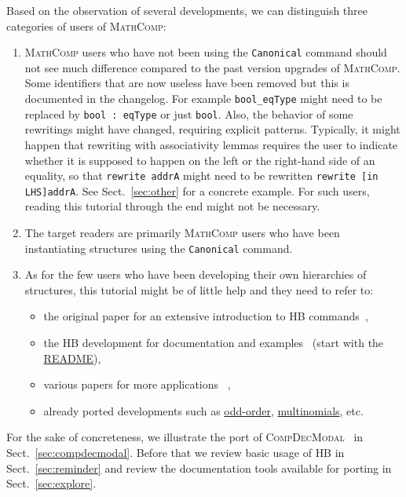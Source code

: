 \documentclass{article}
\def\mathcomp{\textsc{MathComp}}
\def\hb{\textsc{HB}}
\def\compdecmodal{\textsc{CompDecModal}}
\def\coqin#1{\texttt{#1}}
\begin{document}
Based on the observation of several developments, we can distinguish
three categories of users of \mathcomp:
\begin{enumerate}
\item \mathcomp{} users who have not been using the \coqin{Canonical}
  command should not see much difference compared to the past version
  upgrades of \mathcomp{}.
  Some identifiers that are now useless have been removed but this is
  documented in the changelog. For example \coqin{bool_eqType} might
  need to be replaced by \coqin{bool : eqType} or just \coqin{bool}.
  Also, the behavior of some rewritings might have changed, requiring
  explicit patterns. Typically, it might happen that rewriting with
  associativity lemmas requires the user to indicate whether it is
  supposed to happen on the left or the right-hand side of an
  equality, so that \coqin{rewrite addrA} might need to be rewritten
  \coqin{rewrite [in LHS]addrA}. See Sect.~\ref{sec:other} for a
  concrete example.
  For such users, reading this tutorial through the end might not be
  necessary.
\item The target readers are primarily \mathcomp{} users who have been
  instantiating structures using the \coqin{Canonical} command.
\item As for the few users who have been developing their own
  hierarchies of structures, this tutorial might be of little help and
  they need to refer to:
  \begin{itemize}
  \item the original paper for an extensive introduction to \hb{} commands~\cite{cohen2020fscd},
  \item the \hb{} development for documentation and examples~\cite{hb}
    (start with the \href{https://github.com/math-comp/hierarchy-builder#readme}{README}),
  \item various papers for more applications~\cite{mathcomp2021coq}
    \cite[Sect.~3]{affeldt2022arxiv} \cite[Sect.~4]{affeldt2023cpp},
  \item already ported developments such as
    \href{https://github.com/math-comp/odd-order}{odd-order},
    \href{https://github.com/math-comp/multinomials}{multinomials}, etc.
  \end{itemize}
\end{enumerate}

For the sake of concreteness, we illustrate the port of
\compdecmodal~\cite{compdecmodal} in Sect.~\ref{sec:compdecmodal}.
Before that we review basic usage of \hb{} in Sect.~\ref{sec:reminder}
and review the documentation tools available for porting in Sect.~\ref{sec:explore}.
\end{document}
